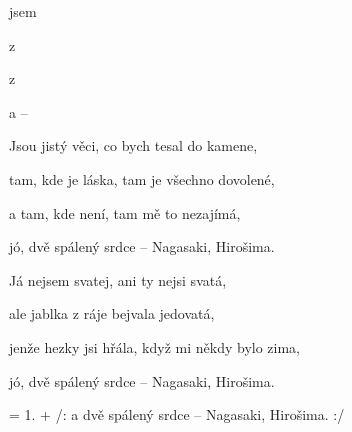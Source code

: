 

\zs
{}   jsem    

z     

z    

a   --      
\ks

\zs
Jsou jistý věci, co bych tesal do kamene,

tam, kde je láska, tam je všechno dovolené,

a tam, kde není, tam mě to nezajímá,

jó, dvě spálený srdce -- Nagasaki, Hirošima.
\ks

\zs
Já nejsem svatej, ani ty nejsi svatá,

ale jablka z ráje bejvala jedovatá,

jenže hezky jsi hřála, když mi někdy bylo zima,

jó, dvě spálený srdce -- Nagasaki, Hirošima.
\ks

\zs
= 1. + /: a dvě spálený srdce -- Nagasaki, Hirošima. :/
\ks

\kp
